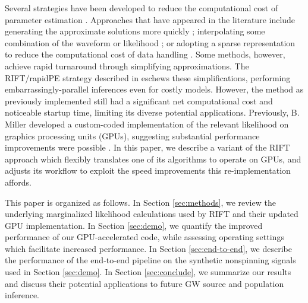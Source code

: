 \documentclass[twocolumn,prd,nofootinbib]{revtex4}
\begin{document}
Several strategies have been
developed to reduce the 
computational cost of parameter estimation \cite{gwastro-pe-Brandon-STF2,gwastro-PE-AlternativeArchitectures,gw-astro-ReducedOrderQuadraturePE-TiglioEtAl2014,2016PhRvD..94d4031S,2017CQGra..34k5006V}.  
Approaches that have appeared in the literature include
generating the approximate solutions more quickly \cite{gwastro-mergers-PE-ReducedOrder-2013,2014PhRvX...4c1006F,2013PhRvD..87l2002S,2013PhRvD..87d4008C,gwastro-mergers-IMRPhenomP,gwastro-SpinTaylorF2-2013}; 
interpolating some combination
of the waveform or likelihood \cite{gwastro-approx-ROMNR-Blackman2015,2013PhRvD..87d4008C,2013PhRvD..87l2002S,2014CQGra..31s5010P,2014PhRvD..90d4074S,gwastro-PE-AlternativeArchitectures,cole2014likelihood,2012MNRAS.421..169G};  or 
adopting a sparse representation to reduce the computational cost of data
handling \cite{antil2013two,gwastro-mergers-PE-ReducedOrder-2013,2016PhRvD..94d4031S,gw-astro-ReducedOrderQuadraturePE-TiglioEtAl2014,gwastro-PE-AlternativeArchitectures}.   %
 Some methods, however, achieve rapid turnaround through simplifying approximations.  
%
The RIFT/rapidPE strategy described in \cite{gwastro-PE-AlternativeArchitectures,2017CQGra..34n4002O,gwastro-PENR-RIFT,NRPaper} eschews these simplifications, performing
embarrassingly-parallel inferences even for costly models.   However, the method as previously implemented still had a
significant net  computational cost and noticeable startup time, limiting its diverse potential applications.
%
Previously, B. Miller  developed a custom-coded  implementation of the
relevant likelihood on graphics processing units (GPUs), suggesting substantial performance improvements were possible \cite{Thesis-Brandon-2016,GPU-NU-work}.  
In this paper,  we describe a variant of the RIFT approach which flexibly translates one of its
algorithms to operate on GPUs, and adjusts its workflow to exploit the speed improvements
this re-implementation affords.


This paper is organized as follows.
In Section \ref{sec:methods}, we review the underlying marginalized likelihood calculations used by RIFT and  their updated GPU
implementation.  
In Section \ref{sec:demo}, we quantify the improved performance of our  GPU-accelerated code,   while assessing
operating settings which facilitate increased performance.
In Section \ref{sec:end-to-end}, we describe the performance of the end-to-end pipeline on the synthetic nonspinning signals used in
Section \ref{sec:demo}.  
In Section \ref{sec:conclude}, we summarize our results and discuss their potential applications to future GW source and
population inference.
\end{document}
